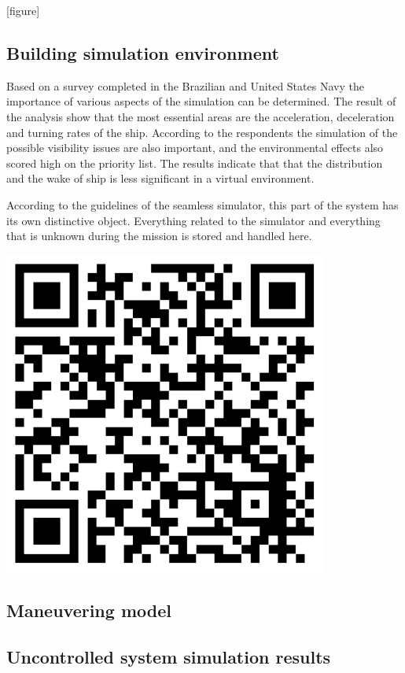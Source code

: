 [figure]

\subsection{Building simulation environment}

Based on a survey completed in the Brazilian and United States Navy the importance of various aspects of the simulation can be determined\cite[p.~6]{shipsim}. The result of the analysis show that the most essential areas are the acceleration, deceleration and turning rates of the ship. According to the respondents the simulation of the possible visibility issues are also important, and the environmental effects also scored high on the priority list. The results indicate that that the distribution and the wake of ship is less significant in a virtual environment.

\begin{tcolorbox}[colback=cyan!5,colframe=cyan!40!black,title=Code: Simulator.py \\ https://www.dropbox.com/s/agron9anslev6xw/Simulator.py]
\begin{minipage}{0,6\textwidth}
According to the guidelines of the seamless simulator, this part of the system has its own distinctive object. Everything related to the simulator and everything that is unknown during the mission is stored and handled here.
\end{minipage}
\begin{minipage}{0,35\textwidth}
\raggedleft
\includegraphics[width=0.8\textwidth]{img/simulatorcode}
\end{minipage}
\end{tcolorbox}

\subsection{Maneuvering model}

\subsection{Uncontrolled system simulation results}